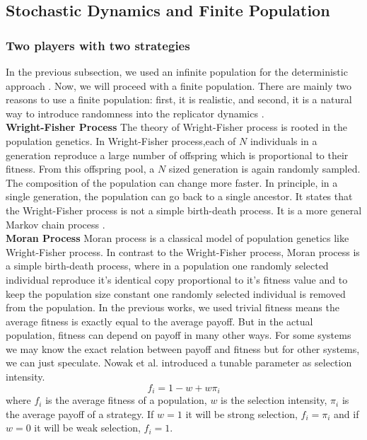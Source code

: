 \documentclass{article}
\begin{document}
\subsection{Stochastic Dynamics and Finite Population}
\subsubsection{Two players with two strategies}
In the previous subsection, we used an infinite population for the deterministic approach \citep{Hofbauer2003}.
Now, we will proceed with a finite population.
There are mainly two reasons to use a finite population: first, it is realistic, and second, it is a natural way to introduce randomness into the replicator dynamics \citep{Altrock2010}.\\
\textbf{Wright-Fisher Process}
\newline
The theory of Wright-Fisher process is rooted in the population genetics. In Wright-Fisher process,each of $N$ individuals in a generation reproduce a large number of offspring which is proportional to their fitness.
From this offspring pool, a $N$ sized generation is again randomly sampled. The composition of the population can change more faster. In principle, in a single generation, the population can go back to a single ancestor. 
It states that the Wright-Fisher process is not a simple birth-death process. It is a more general Markov chain process \citep{Imhof2006}.\\
\textbf{Moran Process}
\newline
Moran process is a classical model of population genetics like Wright-Fisher process. In contrast to the Wright-Fisher process, Moran process is a simple birth-death process, where in a population one randomly selected individual reproduce it's identical copy proportional to it's fitness value and to keep the population size constant one randomly selected individual is removed from the population.
In the previous works, we used trivial fitness means the average fitness is exactly equal to the average payoff. But in the actual population, fitness can depend on payoff in many other ways. For some systems we may know the exact relation between payoff and fitness but for other systems, we can just speculate.
Nowak et al.\citep{Nowak2004} introduced a tunable parameter as selection intensity. 
\begin{equation}
f_i=1-w+w\pi_i \label{eq:12}
\end{equation}
where $f_i$ is the average fitness of a population, $w$ is the selection intensity, $\pi_i$ is the average payoff of a strategy. If $w=1$ it will be strong selection, $f_i=\pi_i$ and if $w=0$ it will be weak selection, $f_i=1$.\\
\end{document}
